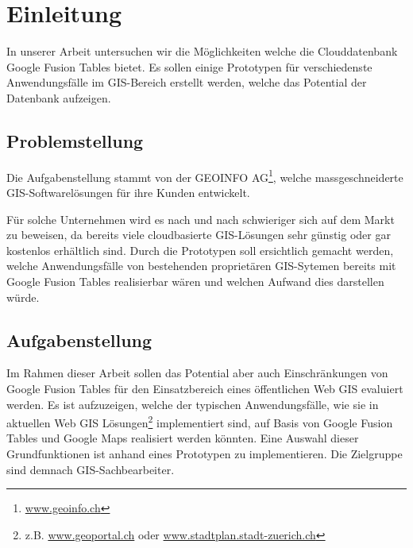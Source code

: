 \chapter{Einleitung}
In unserer Arbeit untersuchen wir die Möglichkeiten welche die Clouddatenbank Google Fusion Tables bietet. Es sollen einige Prototypen für verschiedenste Anwendungsfälle im GIS-Bereich erstellt werden, welche das Potential der Datenbank aufzeigen.

\section{Problemstellung}
Die Aufgabenstellung stammt von der GEOINFO AG\footnote{\url{www.geoinfo.ch}}, welche massgeschneiderte GIS-Softwarelösungen für ihre Kunden entwickelt.

Für solche Unternehmen wird es nach und nach schwieriger sich auf dem Markt zu beweisen, da bereits viele cloudbasierte GIS-Lösungen sehr günstig oder gar kostenlos erhältlich sind. Durch die Prototypen soll ersichtlich gemacht werden, welche Anwendungsfälle von bestehenden proprietären GIS-Sytemen bereits mit Google Fusion Tables realisierbar wären und welchen Aufwand dies darstellen würde.

\section{Aufgabenstellung}
Im Rahmen dieser Arbeit sollen das Potential aber auch Einschränkungen von Google Fusion Tables für den Einsatzbereich eines öffentlichen Web GIS evaluiert werden. Es ist aufzuzeigen, welche der typischen Anwendungsfälle, wie sie in aktuellen Web GIS Lösungen\footnote{z.B. \url{www.geoportal.ch} oder \url{www.stadtplan.stadt-zuerich.ch}} implementiert sind, auf Basis von Google Fusion Tables und Google Maps realisiert werden könnten. Eine Auswahl dieser Grundfunktionen ist anhand eines Prototypen zu implementieren. Die Zielgruppe sind demnach GIS-Sachbearbeiter.

